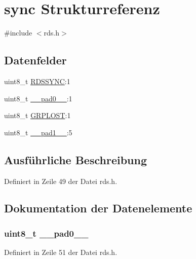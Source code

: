 \hypertarget{structsync}{}\section{sync Strukturreferenz}
\label{structsync}


{\ttfamily \#include $<$rds.\+h$>$}

\subsection*{Datenfelder}
\begin{DoxyCompactItemize}
\item 
uint8\+\_\+t \hyperlink{structsync_acdf4253982980384be3340fd9a9ab7c5}{R\+D\+S\+S\+Y\+N\+C}\+:1
\item 
uint8\+\_\+t \hyperlink{structsync_a8b4eebe79ded0459acec2f4950102ba3}{\+\_\+\+\_\+pad0\+\_\+\+\_\+}\+:1
\item 
uint8\+\_\+t \hyperlink{structsync_a430b332cff3a3786c4854defcd95d078}{G\+R\+P\+L\+O\+S\+T}\+:1
\item 
uint8\+\_\+t \hyperlink{structsync_a77f12d2e278bd5c07712648ac0df5e08}{\+\_\+\+\_\+pad1\+\_\+\+\_\+}\+:5
\end{DoxyCompactItemize}


\subsection{Ausführliche Beschreibung}


Definiert in Zeile 49 der Datei rds.\+h.



\subsection{Dokumentation der Datenelemente}
\hypertarget{structsync_a8b4eebe79ded0459acec2f4950102ba3}{}
\subsubsection[{\+\_\+\+\_\+pad0\+\_\+\+\_\+}]{\setlength{\rightskip}{0pt plus 5cm}uint8\+\_\+t \+\_\+\+\_\+pad0\+\_\+\+\_\+}\label{structsync_a8b4eebe79ded0459acec2f4950102ba3}


Definiert in Zeile 51 der Datei rds.\+h.

\hypertarget{structsync_a77f12d2e278bd5c07712648ac0df5e08}{}

